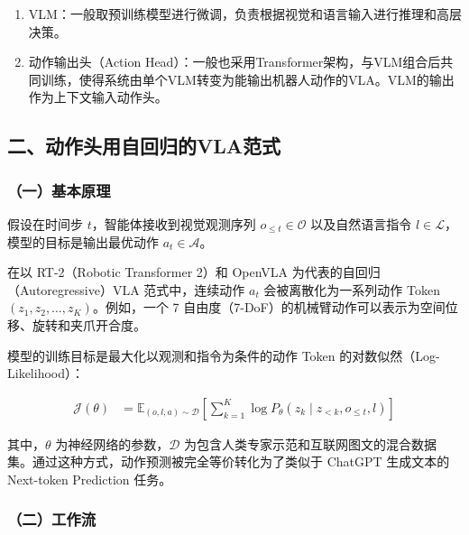\begin{enumerate}
\def\labelenumi{\arabic{enumi}.}
\item
  VLM：一般取预训练模型进行微调，负责根据视觉和语言输入进行推理和高层决策。
\item
  动作输出头（Action Head）：一般也采用Transformer架构，与VLM组合后共同训练，使得系统由单个VLM转变为能输出机器人动作的VLA。VLM的输出作为上下文输入动作头。
\end{enumerate}

\hypertarget{ux4e8cux52a8ux4f5cux5934ux7528ux81eaux56deux5f52ux7684vlaux8303ux5f0f}{%
\subsection{二、动作头用自回归的VLA范式}\label{ux4e8cux52a8ux4f5cux5934ux7528ux81eaux56deux5f52ux7684vlaux8303ux5f0f}}

\hypertarget{ux4e00ux57faux672cux539fux7406-2}{%
\subsubsection{（一）基本原理}\label{ux4e00ux57faux672cux539fux7406-2}}

假设在时间步 \(t\)，智能体接收到视觉观测序列 \(o_{\le t}\in\mathcal{O}\) 以及自然语言指令 \(l\in\mathcal{L}\)，模型的目标是输出最优动作 \(a_t\in\mathcal{A}\)。

在以 RT-2（Robotic Transformer 2）和 OpenVLA 为代表的自回归（Autoregressive）VLA 范式中，连续动作 \(a_t\) 会被离散化为一系列动作 Token \((z_1,z_2,\ldots,z_K)\)。例如，一个 7 自由度（7-DoF）的机械臂动作可以表示为空间位移、旋转和夹爪开合度。

模型的训练目标是最大化以观测和指令为条件的动作 Token 的对数似然（Log-Likelihood）：

\[
\begin{aligned}
\mathcal{J}(\theta)
&=
\mathbb{E}_{(o,l,a)\sim\mathcal{D}}
\left[
\sum_{k=1}^{K}
\log P_{\theta}(z_k\mid z_{<k}, o_{\le t}, l)
\right]
\end{aligned}
\]

其中，\(\theta\) 为神经网络的参数，\(\mathcal{D}\) 为包含人类专家示范和互联网图文的混合数据集。通过这种方式，动作预测被完全等价转化为了类似于 ChatGPT 生成文本的 Next-token Prediction 任务。

\hypertarget{ux4e8cux5de5ux4f5cux6d41-4}{%
\subsubsection{（二）工作流}\label{ux4e8cux5de5ux4f5cux6d41-4}}

